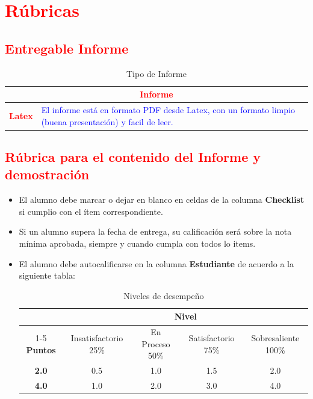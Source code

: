 \documentclass{article}
\begin{document}
	\section{\textcolor{red}{Rúbricas}}
	
	\subsection{\textcolor{red}{Entregable Informe}}
	\begin{table}[H]
		\caption{Tipo de Informe}
		\setlength{\tabcolsep}{0.5em} %
		{\renewcommand{\arraystretch}{1.5}%
		\begin{tabular}{|p{3cm}|p{12cm}|}
			\hline
			\multicolumn{2}{|c|}{\textbf{\textcolor{red}{Informe}}}  \\
			\hline 
			\textbf{\textcolor{red}{Latex}} & \textcolor{blue}{El informe está en formato PDF desde Latex,  con un formato limpio (buena presentación) y facil de leer.}   \\ 
			\hline 
			
			
		\end{tabular}
	}
	\end{table}
	
	\clearpage
	
	\subsection{\textcolor{red}{Rúbrica para el contenido del Informe y demostración}}
	\begin{itemize}			
		\item El alumno debe marcar o dejar en blanco en celdas de la columna \textbf{Checklist} si cumplio con el ítem correspondiente.
		\item Si un alumno supera la fecha de entrega,  su calificación será sobre la nota mínima aprobada, siempre y cuando cumpla con todos lo items.
		\item El alumno debe autocalificarse en la columna \textbf{Estudiante} de acuerdo a la siguiente tabla:
	
		\begin{table}[ht]
			\caption{Niveles de desempeño}
			\begin{center}
			\begin{tabular}{ccccc}
    			\hline
    			 & \multicolumn{4}{c}{Nivel}\\
    			\cline{1-5}
    			\textbf{Puntos} & Insatisfactorio 25\%& En Proceso 50\% & Satisfactorio 75\% & Sobresaliente 100\%\\
    			\textbf{2.0}&0.5&1.0&1.5&2.0\\
    			\textbf{4.0}&1.0&2.0&3.0&4.0\\
    		\hline
			\end{tabular}
		\end{center}
	\end{table}	
	
	\end{itemize}
	
\end{document}
